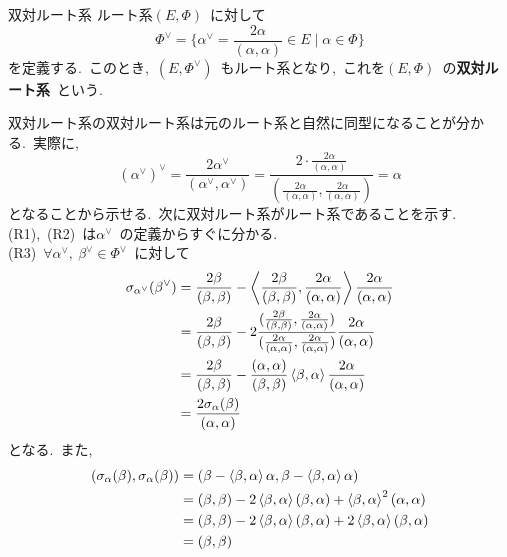 \documentclass[uplatex,dvipdfmx]{jsarticle}
\begin{document}
\begin{mydef}{双対ルート系}
    ルート系$(E,\Phi)$~に対して
    \begin{equation*}
        \Phi^\vee = \{\alpha^\vee = \frac{2 \alpha}{(\alpha, \alpha)}\in E \mid \alpha \in \Phi\}
    \end{equation*}
    を定義する.~このとき,~$(E, \Phi^\vee)$~もルート系となり,~これを$(E,\Phi)$~の\textbf{双対ルート系}~という.
\end{mydef}
双対ルート系の双対ルート系は元のルート系と自然に同型になることが分かる.~実際に,
\begin{equation*}
    (\alpha^\vee)^\vee = \frac{2\alpha^\vee}{(\alpha^\vee, \alpha^\vee)} = \frac{2\cdot \frac{2\alpha}{(\alpha, \alpha)}}{\left( \frac{2\alpha}{(\alpha, \alpha)}, \frac{2\alpha}{(\alpha, \alpha)} \right)} = \alpha
\end{equation*}
となることから示せる.~次に双対ルート系がルート系であることを示す.\\
(R1),~(R2)~は$\alpha^\vee$~の定義からすぐに分かる.\\
(R3)~$\forall \alpha^\vee ,~\beta^\vee \in \Phi^\vee$~に対して
\begin{equation*}
    \begin{split}
        \sigma_{\alpha^\vee}(\beta^\vee) &= \frac{2\beta}{(\beta,\beta)}- \ev{\frac{2\beta}{(\beta, \beta)}, \frac{2\alpha}{(\alpha, \alpha)}} \frac{2\alpha}{(\alpha, \alpha)}\\
        &= \frac{2\beta}{(\beta,\beta)} - 2\frac{(\frac{2\beta}{(\beta, \beta)}, \frac{2\alpha}{(\alpha, \alpha)})}{(\frac{2\alpha}{(\alpha, \alpha)}, \frac{2\alpha}{(\alpha, \alpha)})}\frac{2\alpha}{(\alpha, \alpha)}\\
        &= \frac{2\beta}{(\beta,\beta)} - \frac{(\alpha,\alpha)}{(\beta,\beta)} \ev{\beta,\alpha}\frac{2\alpha}{(\alpha, \alpha)}\\
        &= \frac{2\sigma_\alpha(\beta)}{(\alpha, \alpha)}
    \end{split}
\end{equation*}
となる.~また,
\begin{equation*}
    \begin{split}
        (\sigma_\alpha(\beta), \sigma_\alpha(\beta)) &= (\beta - \ev{\beta, \alpha}\alpha, \beta - \ev{\beta, \alpha}\alpha)\\
        &= (\beta, \beta) - 2\ev{\beta, \alpha}(\beta, \alpha) + \ev{\beta, \alpha}^2 (\alpha, \alpha)\\
        &= (\beta, \beta) - 2\ev{\beta, \alpha}(\beta, \alpha) + 2\ev{\beta, \alpha}(\beta, \alpha)\\
        &= (\beta, \beta)
    \end{split}
\end{equation*}
\end{document}
